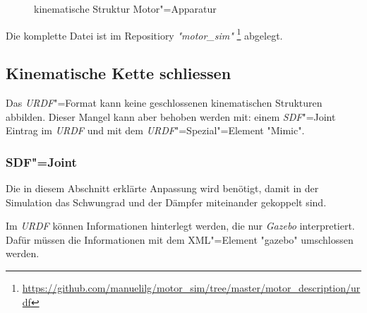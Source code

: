 \begin{figure}[ht!]
	\centering
{}
	\caption{kinematische Struktur Motor"=Apparatur}
	\label{Ab:motor-struktur}
\end{figure}

Die komplette Datei ist im Repositiory \textit{\textsc{"}motor\_sim\textit{"}} \footnote{\url{https://github.com/manuelilg/motor_sim/tree/master/motor_description/urdf}} abgelegt.


\subsection{Kinematische Kette schliessen}
\label{chap:kin-schliessen}
Das \textit{URDF}"=Format kann keine geschlossenen kinematischen Strukturen abbilden.
Dieser Mangel kann aber behoben werden mit: einem \textit{SDF}"=Joint Eintrag im \textit{URDF} und mit dem \textit{URDF}"=Spezial"=Element \textsc{"}Mimic\textsc{"}.

\subsubsection{SDF"=Joint}
\label{chap:sdf-joint}
Die in diesem Abschnitt erklärte Anpassung wird benötigt, damit in der Simulation das Schwungrad und der Dämpfer miteinander gekoppelt sind.

Im \textit{URDF} können Informationen hinterlegt werden, die nur \textit{Gazebo} interpretiert.
Dafür müssen die Informationen mit dem XML"=Element \textsc{"}gazebo\textsc{"} umschlossen werden.

